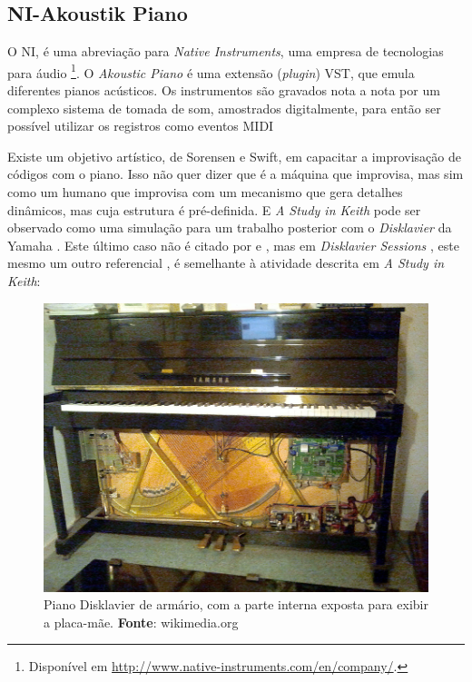 \subsection{NI-Akoustik Piano}\label{sec:NI}

O NI, é uma abreviação para \emph{Native Instruments}, uma empresa de tecnologias para áudio \footnote{Disponível em \url{http://www.native-instruments.com/en/company/}.}. O \emph{Akoustic Piano} é uma extensão (\emph{plugin}) VST, que emula diferentes pianos acústicos. Os instrumentos são gravados nota a nota por um complexo sistema de tomada de som, amostrados digitalmente, para então ser possível utilizar os registros como eventos MIDI

Existe um objetivo artístico, de Sorensen e Swift, em capacitar a improvisação de códigos com o piano. Isso não quer dizer que é a máquina que improvisa, mas sim como um humano que improvisa com um mecanismo que gera detalhes dinâmicos, mas cuja estrutura é pré-definida. E \emph{A Study in Keith} pode ser observado como uma simulação para um trabalho posterior com o \emph{Disklavier} da Yamaha . Este último caso não é citado por  e , mas em \emph{Disklavier Sessions} \cite{sorensen_disklavier_2013}, este mesmo um outro referencial , é semelhante à atividade descrita em \emph{A Study in Keith}:

\begin{figure}[h]
  \centering
  \includegraphics[scale=0.5]{imagens/disklavier.jpg}
  \caption{Piano Disklavier de armário, com a parte interna exposta para exibir a placa-mãe. \textbf{Fonte}: wikimedia.org}
  \label{fig:disklavier}
\end{figure}

